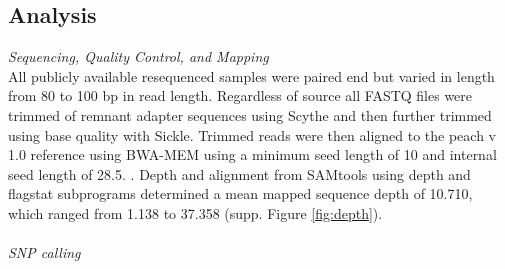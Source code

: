 \documentclass[12pt]{article}
\begin{document}
\subsection*{Analysis}
\emph{Sequencing, Quality Control, and Mapping}\\
All publicly available resequenced samples were paired end but varied in length from 80 to 100 bp in read length. 
%
Regardless of source all FASTQ files were trimmed of remnant adapter sequences using Scythe and then further trimmed using base quality with Sickle. 
%
%
%
Trimmed reads were then aligned to the peach v 1.0 reference using BWA-MEM using a minimum seed length of 10 and internal seed length of 28.5.
%
 \citep{li2013aligning}. 
%
Depth and alignment from SAMtools using depth and flagstat subprograms \citep{li2009sequence} 
determined a mean mapped sequence depth of 10.710, which ranged from 1.138 to 37.358 (supp. Figure \ref{fig:depth}).\\ %
%
%
\\
\emph{SNP calling}\\ %
%
\end{document}
